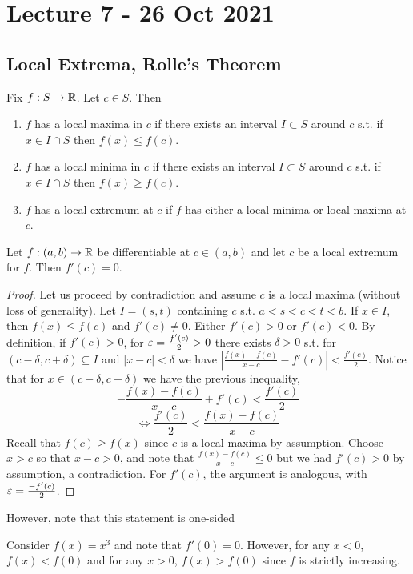 \section{Lecture 7 - 26 Oct 2021}
\subsection{Local Extrema, Rolle's Theorem}
\begin{definition}
  Fix $f:S\to\mathbb R$. Let $c\in S$. Then 
  \begin{enumerate}
    \item $f$ has a local maxima in $c$ if there exists an interval $I\subset S$ around
      $c$ s.t. if $x\in I\cap S$ then $f(x)\leq f(c)$.
    \item $f$ has a local minima in $c$ if there exists an interval $I\subset S$ around
      $c$ s.t. if $x\in I\cap S$ then $f(x)\geq f(c)$.
    \item $f$ has a local extremum at $c$ if $f$ has either a local minima or local maxima
      at $c$.
  \end{enumerate}
  \label{<+label+>}
\end{definition}


\begin{lemma}
  Let $f:(a,b)\to\mathbb R$ be differentiable at $c\in(a,b)$ and let $c$ be a local extremum for
  $f$. Then $f'(c)=0$.
  \label{<+label+>}
\end{lemma}
\begin{proof}
  Let us proceed by contradiction and assume $c$ is a local maxima (without loss of
  generality). Let $I=(s,t)$ containing $c$ s.t. $a<s<c<t<b$. If $x\in I$, then $f(x)\leq
  f(c)$ and $f'(c)\neq 0$. Either $f'(c)>0$ or $f'(c)<0$. By definition, if $f'(c)>0$, for
  $\varepsilon=\frac{f'(c)}{2}>0$ there exists $\delta>0$ s.t. for $(c-\delta, c+\delta)\subseteq
  I$ and $|x-c|<\delta$ we have
  $\left|\frac{f(x)-f(c)}{x-c}-f'(c)\right|<\frac{f'(c)}{2}$. Notice that for $x\in
  (c-\delta, c+\delta)$ we have the previous inequality,
  \[-\frac{f(x)-f(c)}{x-c}+ f'(c) < \frac{f'(c)}{2}\]
  \[ \iff \frac{f'(c)}{2} < \frac{f(x)-f(c)}{x-c}\]
  Recall that $f(c)\geq f(x)$ since $c$ is a local maxima by assumption. Choose $x>c$ so
  that $x-c>0$, and note that $\frac{f(x)-f(c)}{x-c} \leq 0$ but we had $f'(c)>0$ by
  assumption, a contradiction. For $f'(c)$, the argument is analogous, with
  $\varepsilon=\frac{-f'(c)}{2}$.
\end{proof}
However, note that this statement is one-sided
\begin{example}
  Consider $f(x)=x^3$ and note that $f'(0)=0$. However, for any $x<0$, $f(x)<f(0)$ and for
  any $x>0$, $f(x)>f(0)$ since $f$ is strictly increasing. 
\end{example}

